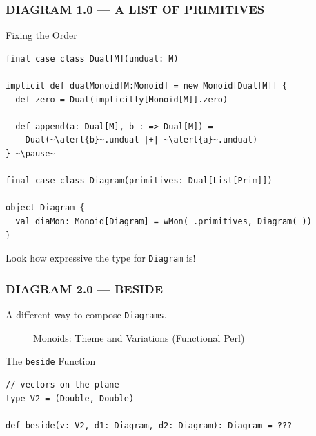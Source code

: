 \documentclass{beamer}
\begin{document}
\begin{frame}[fragile] \frametitle{DIAGRAM 1.0 --- A LIST OF PRIMITIVES}
  \begin{block}{Fixing the Order}
  \begin{lstlisting}
final case class Dual[M](undual: M)

implicit def dualMonoid[M:Monoid] = new Monoid[Dual[M]] {
  def zero = Dual(implicitly[Monoid[M]].zero)

  def append(a: Dual[M], b : => Dual[M]) =
    Dual(~\alert{b}~.undual |+| ~\alert{a}~.undual)
} ~\pause~

final case class Diagram(primitives: Dual[List[Prim]])

object Diagram {
  val diaMon: Monoid[Diagram] = wMon(_.primitives, Diagram(_))
}
  \end{lstlisting}
    \vspace{-0.3cm}
  \end{block}

Look how expressive the type for \texttt{Diagram} is!
\end{frame}

\begin{frame}[fragile] \frametitle{DIAGRAM 2.0 --- BESIDE}
A different way to compose \texttt{Diagrams}.

  \begin{figure}
      \centering
      \caption{Monoids: Theme and Variations (Functional Perl)}
  \end{figure}

\vspace{-0.5cm}

  \begin{block}{The \texttt{beside} Function}
    \vspace{-0.2cm}
  \begin{lstlisting}
// vectors on the plane
type V2 = (Double, Double)

def beside(v: V2, d1: Diagram, d2: Diagram): Diagram = ???
  \end{lstlisting}
\vspace{-0.5cm}
  \end{block}
\end{frame}
\end{document}
